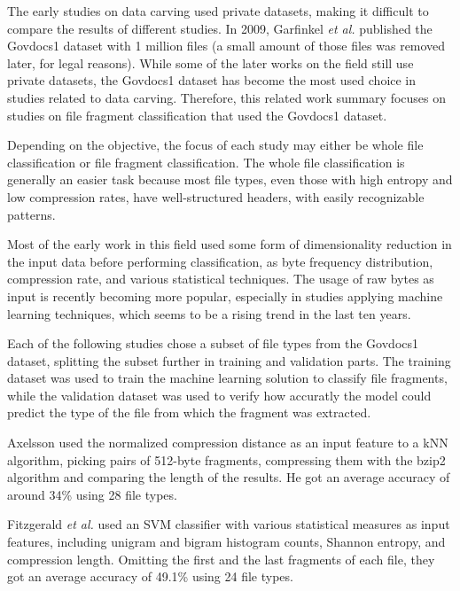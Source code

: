 The early studies on data carving  used private datasets, making it difficult to compare the results of different studies. In 2009, Garfinkel \textit{et al.} \cite{garfinkel_bringing_2009} published the Govdocs1 dataset with 1 million files (a small amount of those files was removed later, for legal reasons). While some of the later works on the field still use private datasets, the Govdocs1 dataset has become the most used choice in studies related to data carving.
Therefore, this related work summary focuses on studies on file fragment classification that used the Govdocs1 dataset.

Depending on the objective, the focus of each study may either be whole file classification or file fragment classification. The whole file classification is generally an easier task because most file types, even those with high entropy and low compression rates, have well-structured headers, with easily recognizable patterns.

Most of the early work in this field used some form of dimensionality reduction in the input data before performing classification, as byte frequency distribution, compression rate, and various statistical techniques. The usage of raw bytes as input is recently becoming more popular, especially in studies applying machine learning techniques, which seems to be a rising trend in the last ten years.

Each of the following studies chose a subset of file types from the Govdocs1 dataset, splitting the subset further in training and validation parts. The training dataset was used to train the machine learning solution to classify file fragments, while the validation dataset was used to verify how accuratly the model could predict the type of the file from which the fragment was extracted. 


Axelsson \cite{axelsson_normalised_2010} used the normalized compression distance as an input feature to a kNN algorithm, picking pairs of 512-byte fragments, compressing them with the bzip2 algorithm and comparing the length of the results.
He got an average accuracy of around 34\% using 28 file types.

Fitzgerald \textit{et al.} \cite{fitzgerald_using_2012}  used an SVM classifier with various statistical measures as input features, including unigram and bigram histogram counts, Shannon entropy, and compression length.
Omitting the first and the last fragments of each file, they got an average accuracy of 49.1\% using 24 file types.

